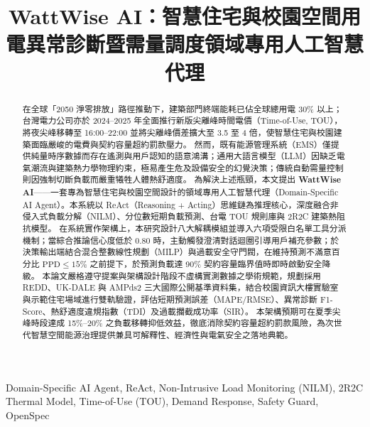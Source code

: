 \documentclass[conference]{IEEEtran}
\begin{document}
\title{WattWise AI：智慧住宅與校園空間用電異常診斷暨需量調度領域專用人工智慧代理}

\author{
}

\maketitle

\begin{abstract}
在全球「2050 淨零排放」路徑推動下，建築部門終端能耗已佔全球總用電 30\% 以上；台灣電力公司亦於 2024--2025 年全面推行新版尖離峰時間電價（Time-of-Use, TOU），將夜尖峰移轉至 16:00--22:00 並將尖離峰價差擴大至 3.5 至 4 倍，使智慧住宅與校園建築面臨嚴峻的電費與契約容量超約罰款壓力。
然而，既有能源管理系統（EMS）僅提供純量時序數據而存在遙測與用戶認知的語意鴻溝；通用大語言模型（LLM）因缺乏電氣潮流與建築熱力學物理約束，極易產生危及設備安全的幻覺決策；傳統自動需量控制則因強制切斷負載而嚴重犧牲人體熱舒適度。
為解決上述瓶頸，本文提出 \textbf{WattWise AI}——一套專為智慧住宅與校園空間設計的領域專用人工智慧代理（Domain-Specific AI Agent）。本系統以 ReAct（Reasoning + Acting）思維鏈為推理核心，深度融合非侵入式負載分解（NILM）、分位數短期負載預測、台電 TOU 規則庫與 2R2C 建築熱阻抗模型。
在系統實作架構上，本研究設計八大解耦模組並導入六項受限白名單工具分派機制；當綜合推論信心度低於 0.80 時，主動觸發澄清對話迴圈引導用戶補充參數；於決策輸出端結合混合整數線性規劃（MILP）與過載安全守門閥，在維持預測不滿意百分比 $\text{PPD} \le 15\%$ 之前提下，於預測負載達 90\% 契約容量臨界值時即時啟動安全降級。
本論文嚴格遵守提案與架構設計階段不虛構實測數據之學術規範，規劃採用 REDD、UK-DALE 與 AMPds2 三大國際公開基準資料集，結合校園資訊大樓實驗室與示範住宅場域進行雙軌驗證，評估短期預測誤差（MAPE/RMSE）、異常診斷 F1-Score、熱舒適度違規指數（TDI）及過載攔截成功率（SIR）。
本架構預期可在夏季尖峰時段達成 15\%--20\% 之負載移轉抑低效益，徹底消除契約容量超約罰款風險，為次世代智慧空間能源治理提供兼具可解釋性、經濟性與電氣安全之落地典範。
\end{abstract}

\begin{IEEEkeywords}
Domain-Specific AI Agent, ReAct, Non-Intrusive Load Monitoring (NILM), 2R2C Thermal Model, Time-of-Use (TOU), Demand Response, Safety Guard, OpenSpec
\end{IEEEkeywords}
\end{document}

